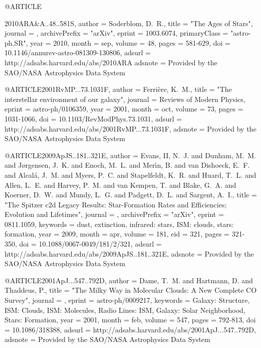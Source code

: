 {@ARTICLE{2010ARA&A..48..581S,
   author = {{Soderblom}, D.~R.},
    title = "{The Ages of Stars}",
  journal = {\araa},
archivePrefix = "arXiv",
   eprint = {1003.6074},
 primaryClass = "astro-ph.SR",
     year = 2010,
    month = sep,
   volume = 48,
    pages = {581-629},
      doi = {10.1146/annurev-astro-081309-130806},
   adsurl = {http://adsabs.harvard.edu/abs/2010ARA%
  adsnote = {Provided by the SAO/NASA Astrophysics Data System}
}

@ARTICLE{2001RvMP...73.1031F,
   author = {{Ferri{\`e}re}, K.~M.},
    title = "{The interstellar environment of our galaxy}",
  journal = {Reviews of Modern Physics},
   eprint = {astro-ph/0106359},
     year = 2001,
    month = oct,
   volume = 73,
    pages = {1031-1066},
      doi = {10.1103/RevModPhys.73.1031},
   adsurl = {http://adsabs.harvard.edu/abs/2001RvMP...73.1031F},
  adsnote = {Provided by the SAO/NASA Astrophysics Data System}
}

@ARTICLE{2009ApJS..181..321E,
   author = {{Evans}, II, N.~J. and {Dunham}, M.~M. and {J{\o}rgensen}, J.~K. and 
	{Enoch}, M.~L. and {Mer{\'{\i}}n}, B. and {van Dishoeck}, E.~F. and 
	{Alcal{\'a}}, J.~M. and {Myers}, P.~C. and {Stapelfeldt}, K.~R. and 
	{Huard}, T.~L. and {Allen}, L.~E. and {Harvey}, P.~M. and {van Kempen}, T. and 
	{Blake}, G.~A. and {Koerner}, D.~W. and {Mundy}, L.~G. and {Padgett}, D.~L. and 
	{Sargent}, A.~I.},
    title = "{The Spitzer c2d Legacy Results: Star-Formation Rates and Efficiencies; Evolution and Lifetimes}",
  journal = {\apjs},
archivePrefix = "arXiv",
   eprint = {0811.1059},
 keywords = {dust, extinction, infrared: stars, ISM: clouds, stars: formation},
     year = 2009,
    month = apr,
   volume = 181,
      eid = {321},
    pages = {321-350},
      doi = {10.1088/0067-0049/181/2/321},
   adsurl = {http://adsabs.harvard.edu/abs/2009ApJS..181..321E},
  adsnote = {Provided by the SAO/NASA Astrophysics Data System}
}

@ARTICLE{2001ApJ...547..792D,
   author = {{Dame}, T.~M. and {Hartmann}, D. and {Thaddeus}, P.},
    title = "{The Milky Way in Molecular Clouds: A New Complete CO Survey}",
  journal = {\apj},
   eprint = {astro-ph/0009217},
 keywords = {Galaxy: Structure, ISM: Clouds, ISM: Molecules, Radio Lines: ISM, Galaxy: Solar Neighborhood, Stars: Formation},
     year = 2001,
    month = feb,
   volume = 547,
    pages = {792-813},
      doi = {10.1086/318388},
   adsurl = {http://adsabs.harvard.edu/abs/2001ApJ...547..792D},
  adsnote = {Provided by the SAO/NASA Astrophysics Data System}
}

}}
